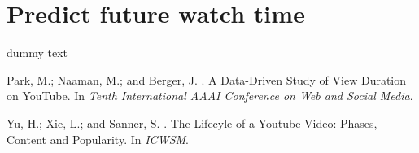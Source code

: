 \documentclass[letterpaper]{article}
\begin{document}
\section{Predict future watch time}
dummy text


\begin{thebibliography}{}

Park, M.; Naaman, M.; and Berger, J.
.
\newblock A Data-Driven Study of View Duration on YouTube.
\newblock In \textit{Tenth International AAAI Conference on Web and Social Media}.

Yu, H.; Xie, L.; and Sanner, S.
.
\newblock The Lifecyle of a Youtube Video: Phases, Content and Popularity.
\newblock In \textit{ICWSM}.
 
\end{thebibliography}

\end{document}
